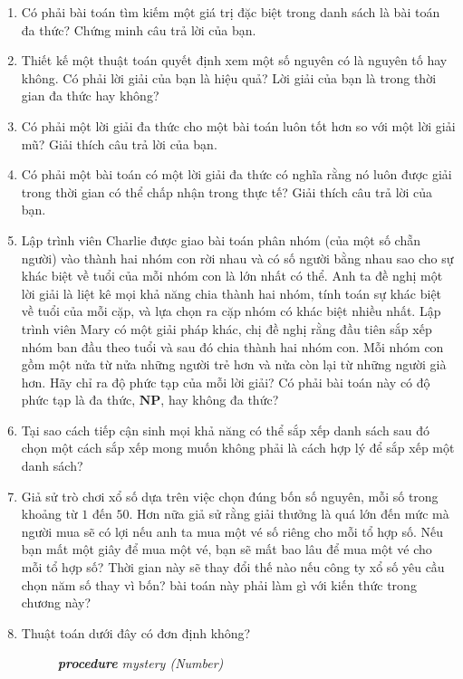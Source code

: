 \begin{multicols}{2}
\begin{enumerate}
  \item Có phải bài toán tìm kiếm một giá trị đặc biệt trong danh sách là bài toán đa
    thức? Chứng minh câu trả lời của bạn.

  \item Thiết kế một thuật toán quyết định xem một số nguyên có là nguyên tố hay không. Có
    phải lời giải của bạn là hiệu quả? Lời giải của bạn là trong thời gian đa thức hay
    không?

  \item Có phải một lời giải đa thức cho một bài toán luôn tốt hơn so với một lời giải mũ?
    Giải thích câu trả lời của bạn.

  \item Có phải một bài toán có một lời giải đa thức có nghĩa rằng nó luôn được giải trong
    thời gian có thể chấp nhận trong thực tế? Giải thích câu trả lời của bạn.


  \item Lập trình viên Charlie được giao bài toán phân nhóm (của một số chẵn người) vào
    thành hai nhóm con rời nhau và có số người bằng nhau sao cho sự khác biệt về tuổi của
    mỗi nhóm con là lớn nhất có thể. Anh ta đề nghị một lời giải là liệt kê mọi khả năng
    chia thành hai nhóm, tính toán sự khác biệt về tuổi của mỗi cặp, và lựa chọn ra cặp
    nhóm có khác biệt nhiều nhất. Lập trình viên Mary có một giải pháp khác, chị đề nghị
    rằng đầu tiên sắp xếp nhóm ban đầu theo tuổi và sau đó chia thành hai nhóm con. Mỗi
    nhóm con gồm một nửa từ nửa những người trẻ hơn và nửa còn lại từ những người già
    hơn. Hãy chỉ ra độ phức tạp của mỗi lời giải? Có phải bài toán này có độ phức tạp là
    đa thức, $\mathbf{NP}$, hay không đa thức?

  \item Tại sao cách tiếp cận sinh mọi khả năng có thể sắp xếp danh sách sau đó chọn một
    cách sắp xếp mong muốn không phải là cách hợp lý để sắp xếp một danh sách?

  \item Giả sử trò chơi xổ số dựa trên việc chọn đúng bốn số nguyên, mỗi số trong khoảng
    từ $1$ đến $50$. Hơn nữa giả sử rằng giải thưởng là quá lớn đến mức mà người mua sẽ có
    lợi nếu anh ta mua một vé số riêng cho mỗi tổ hợp số. Nếu bạn mất một giây để mua một
    vé, bạn sẽ mất bao lâu để mua một vé cho mỗi tổ hợp số? Thời gian này sẽ thay đổi thế
    nào nếu công ty xổ số yêu cầu chọn năm số thay vì bốn? bài toán này phải làm gì với
    kiến thức trong chương này?

  \item Thuật toán dưới đây có đơn định không?
    \begin{description}
    \item [] \textsl{\textbf{procedure} mystery (Number)} 


\end{description}
\end{enumerate}
\end{multicols}
